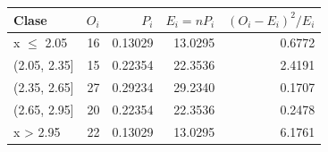 \begin{tabular}{lrrrr}
\toprule
\textbf{Clase} & \textbf{$O_i$} & \textbf{$P_i$} & \textbf{$E_i=nP_i$} & \textbf{$(O_i-E_i)^2/E_i$} \\ \midrule
x $\le$ 2.05 & 16 & 0.13029 & 13.0295 & 0.6772 \\
(2.05, 2.35] & 15 & 0.22354 & 22.3536 & 2.4191 \\
(2.35, 2.65] & 27 & 0.29234 & 29.2340 & 0.1707 \\
(2.65, 2.95] & 20 & 0.22354 & 22.3536 & 0.2478 \\
x > 2.95 & 22 & 0.13029 & 13.0295 & 6.1761 \\
\bottomrule
\end{tabular}